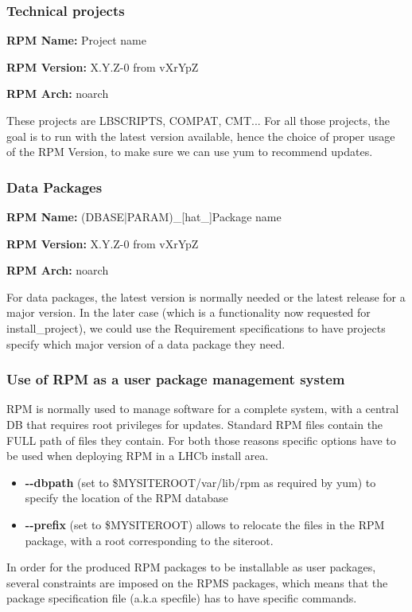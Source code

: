 \documentclass{lhcbnote}
\begin{document}
\subsubsection{Technical projects}
\textbf{RPM Name:} Project name

\textbf{RPM Version:} X.Y.Z-0 from vXrYpZ 

\textbf{RPM Arch:} noarch 


These projects are LBSCRIPTS, COMPAT, CMT... For all those projects, the goal is to run with the latest version available, hence the choice of proper usage of the RPM Version, to make sure we can use yum to recommend updates.

\subsubsection{Data Packages}
\textbf{RPM Name:} (DBASE|PARAM)\_[hat\_]Package name

\textbf{RPM Version:} X.Y.Z-0 from vXrYpZ 

\textbf{RPM Arch:} noarch 


For data packages, the latest version is normally needed or the latest release for a major version. In the later case (which is a functionality now requested for install\_project), we could use the Requirement specifications to have projects specify which major version of a data package they need.
  
\subsubsection{Use of RPM as a user package management system}

RPM is normally used to manage software for a complete system, with a central DB that requires root privileges for updates. Standard RPM files contain the FULL path of files they contain. For both those reasons specific options have to be used when deploying RPM in a LHCb install area.  

\begin{itemize}
\item \textbf{\textrm{-}\textrm{-}dbpath} (set to \$MYSITEROOT/var/lib/rpm as required by yum) to specify the location of the RPM database
\item \textbf{\textrm{-}\textrm{-}prefix} (set to \$MYSITEROOT) allows to relocate the files in the RPM package, with a root corresponding to the siteroot.
\end{itemize}

In order for the produced RPM packages to be installable as user packages, several constraints are imposed on the RPMS packages, which means that the package specification file (a.k.a specfile) has to have specific commands.
\end{document}
